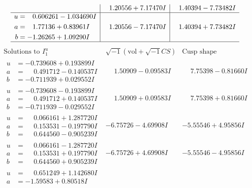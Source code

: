 \documentclass[1p]{elsarticle_modified}
\theoremstyle{definition}
\newcommand{\I}{\sqrt{-1}}
\begin{document}
$$\begin{array}{c|c|c}
 & \phantom{-}1.20556 + 7.17470 I & \phantom{-}1.40394 - 7.73482 I \\ \hline\begin{aligned}
u &= \phantom{-}0.606261 - 1.034690 I \\
a &= \phantom{-}1.77136 + 0.83961 I \\
b &= -1.26265 + 1.09290 I\end{aligned}
 & \phantom{-}1.20556 - 7.17470 I & \phantom{-}1.40394 + 7.73482 I\\
 \hline 
 \end{array}$$\newpage$$\begin{array}{c|c|c}  
\text{Solutions to }I^u_{1}& \I (\text{vol} + \sqrt{-1}CS) & \text{Cusp shape}\\
 \hline 
\begin{aligned}
u &= -0.739608 + 0.193899 I \\
a &= \phantom{-}0.491712 - 0.140537 I \\
b &= -0.711939 + 0.029552 I\end{aligned}
 & \phantom{-}1.50909 - 0.09583 I & \phantom{-}7.75398 - 0.81660 I \\ \hline\begin{aligned}
u &= -0.739608 - 0.193899 I \\
a &= \phantom{-}0.491712 + 0.140537 I \\
b &= -0.711939 - 0.029552 I\end{aligned}
 & \phantom{-}1.50909 + 0.09583 I & \phantom{-}7.75398 + 0.81660 I \\ \hline\begin{aligned}
u &= \phantom{-}0.066161 + 1.287720 I \\
a &= \phantom{-}0.153531 - 0.197790 I \\
b &= \phantom{-}0.644560 - 0.905239 I\end{aligned}
 & -6.75726 - 4.69908 I & -5.55546 + 4.95856 I \\ \hline\begin{aligned}
u &= \phantom{-}0.066161 - 1.287720 I \\
a &= \phantom{-}0.153531 + 0.197790 I \\
b &= \phantom{-}0.644560 + 0.905239 I\end{aligned}
 & -6.75726 + 4.69908 I & -5.55546 - 4.95856 I \\ \hline\begin{aligned}
u &= \phantom{-}0.651249 + 1.142680 I \\
a &= -1.59583 + 0.80518 I \\

\end{aligned}
\end{array}$$
\end{document}
